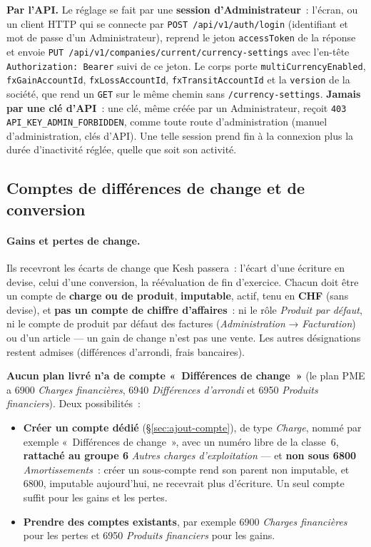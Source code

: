 \documentclass[a4paper,11pt,oneside]{article}
\begin{document}
\begin{sloppypar}
\textbf{Par l'API.} Le réglage se fait par une \textbf{session d'Administrateur}~: l'écran, ou un client HTTP qui se connecte par \texttt{POST /api/v1/auth/login} (identifiant et mot de passe d'un Administrateur), reprend le jeton \texttt{accessToken} de la réponse et envoie \texttt{PUT /api/v1/companies/current/currency-settings} avec l'en-tête \texttt{Authorization: Bearer} suivi de ce jeton. Le corps porte \texttt{multiCurrencyEnabled}, \texttt{fxGainAccountId}, \texttt{fxLossAccountId}, \texttt{fxTransitAccountId} et la \texttt{version} de la société, que rend un \texttt{GET} sur le même chemin sans \texttt{/currency-settings}. \textbf{Jamais par une clé d'API}~: une clé, même créée par un Administrateur, reçoit \texttt{403 API\_\allowbreak KEY\_\allowbreak ADMIN\_\allowbreak FORBIDDEN}, comme toute route d'administration (manuel d'administration, clés d'API). Une telle session prend fin à la connexion plus la durée d'inactivité réglée, quelle que soit son activité.
\end{sloppypar}

\subsection{Comptes de différences de change et de conversion}\label{sec:multi-devises-comptes}

\paragraph{Gains et pertes de change.} Ils recevront les écarts de change que Kesh passera~: l'écart d'une écriture en devise, celui d'une conversion, la réévaluation de fin d'exercice. Chacun doit être un compte de \textbf{charge ou de produit}, \textbf{imputable}, actif, tenu en \textbf{CHF} (sans devise), et \textbf{pas un compte de chiffre d'affaires}~: ni le rôle \emph{Produit par défaut}, ni le compte de produit par défaut des factures (\emph{Administration} → \emph{Facturation}) ou d'un article --- un gain de change n'est pas une vente. Les autres désignations restent admises (différences d'arrondi, frais bancaires).

\textbf{Aucun plan livré n'a de compte «~Différences de change~»} (le plan PME a 6900 \emph{Charges financières}, 6940 \emph{Différences d'arrondi} et 6950 \emph{Produits financiers}). Deux possibilités~:
\begin{itemize}
    \item \textbf{Créer un compte dédié} (\S\ref{sec:ajout-compte}), de type \emph{Charge}, nommé par exemple «~Différences de change~», avec un numéro libre de la classe~6, \textbf{rattaché au groupe 6} \emph{Autres charges d'exploitation} --- et \textbf{non sous 6800} \emph{Amortissements}~: créer un sous-compte rend son parent non imputable, et 6800, imputable aujourd'hui, ne recevrait plus d'écriture. Un seul compte suffit pour les gains et les pertes.
    \item \textbf{Prendre des comptes existants}, par exemple 6900 \emph{Charges financières} pour les pertes et 6950 \emph{Produits financiers} pour les gains.
\end{itemize}
\end{document}
